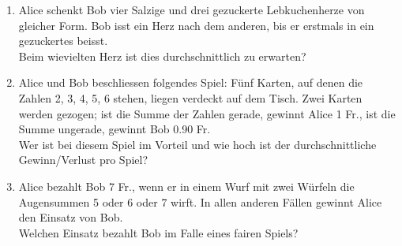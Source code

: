 \begin{ueb}
\begin{enumerate}
        \item Alice schenkt Bob vier Salzige und drei gezuckerte Lebkuchenherze von gleicher Form. Bob isst ein Herz nach dem anderen, bis er erstmals in ein gezuckertes beisst. \\
              Beim wievielten Herz ist dies durchschnittlich zu erwarten?

        \item Alice und Bob beschliessen folgendes Spiel: Fünf Karten, auf denen die Zahlen 2, 3, 4, 5, 6 stehen, liegen verdeckt auf dem Tisch. Zwei Karten werden gezogen; ist die Summe der Zahlen gerade, gewinnt Alice 1 Fr., ist die Summe ungerade, gewinnt Bob 0.90 Fr. \\
              Wer ist bei diesem Spiel im Vorteil und wie hoch ist der durchschnittliche Gewinn/Verlust pro Spiel?

        \item Alice bezahlt Bob 7 Fr., wenn er in einem Wurf mit zwei Würfeln die Augensummen 5 oder 6 oder 7 wirft. In allen anderen Fällen gewinnt Alice den Einsatz von Bob. \\
              Welchen Einsatz bezahlt Bob im Falle eines fairen Spiels?
    \end{enumerate}

\end{ueb}

